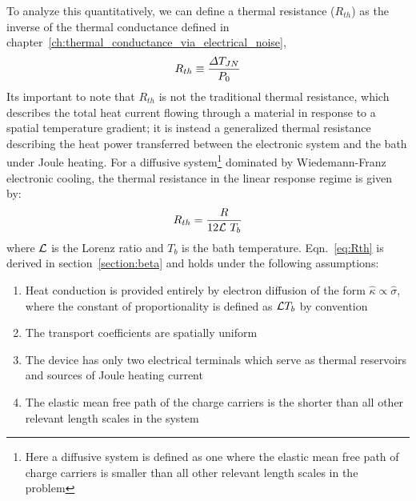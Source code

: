 To analyze this quantitatively, we can define a thermal resistance ($R_{th}$) as the inverse of the thermal conductance defined in chapter~\ref{ch:thermal_conductance_via_electrical_noise},
\begin{equation}
R_{th} \equiv \frac{\Delta T_{JN}}{P_0}
\end{equation}
Its important to note that $R_{th}$ is not the traditional thermal resistance, which describes the total
heat current flowing through a material in response to a spatial temperature gradient; it is instead
a generalized thermal resistance describing the heat power transferred between the electronic
system and the bath under Joule heating. For a diffusive system\footnote{Here a diffusive system is defined as one where the elastic mean free path of charge carriers is smaller than all other relevant length scales in the problem} dominated by Wiedemann-Franz electronic cooling, the thermal resistance in the linear response regime is given by:
\begin{equation}\label{eq:Rth}
R_{th} = \frac{R}{12\mathcal{L}~T_b}
\end{equation}
where $\mathcal{L}$ is the Lorenz ratio and $T_b$ is the bath temperature. Eqn.~\ref{eq:Rth} is derived in section~\ref{section:beta} and holds under the following assumptions:
\begin{enumerate}
\item Heat conduction is provided entirely by electron diffusion of the form $\hat\kappa \propto \hat\sigma$, where the constant of proportionality is defined as $\mathcal{L} T_b$ by convention
\item The transport coefficients are spatially uniform
\item The device has only two electrical terminals which serve as thermal reservoirs and sources of Joule heating current
\item The elastic mean free path of the charge carriers is the shorter than all other relevant length scales in the system
\end{enumerate}
